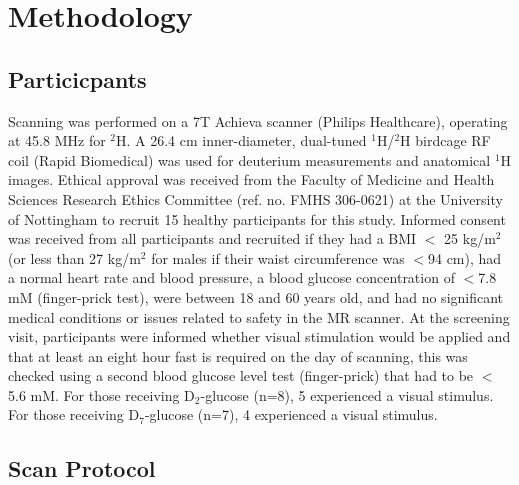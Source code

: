\documentclass[class=article, crop=false]{standalone}
\begin{document}
\section{Methodology}

\subsection{Particicpants}

Scanning was performed on a 7T Achieva scanner (Philips Healthcare), operating at 45.8 MHz for $^2$H. A 26.4 cm inner-diameter, dual-tuned $^1$H/$^2$H birdcage RF coil (Rapid Biomedical) was used for deuterium measurements and anatomical $^1$H images. Ethical approval was received from the Faculty of Medicine and Health Sciences Research Ethics Committee (ref. no. FMHS 306-0621) at the University of Nottingham to recruit 15 healthy participants for this study. Informed consent was received from all participants and recruited if they had a BMI $<$ 25 kg/m$^2$ (or less than 27 kg/m$^2$ for males if their waist circumference was $<$94 cm), had a normal heart rate and blood pressure, a blood glucose concentration of $<$7.8 mM (finger-prick test), were between 18 and 60 years old, and had no significant medical conditions or issues related to safety in the MR scanner. At the screening visit, participants were informed whether visual stimulation would be applied and that at least an eight hour fast is required on the day of scanning, this was checked using a second blood glucose level test (finger-prick) that had to be $<$5.6 mM. For those receiving D$_2$-glucose (n=8), 5 experienced a visual stimulus. For those receiving D$_7$-glucose (n=7), 4 experienced a visual stimulus.

\subsection{Scan Protocol}
\end{document}
